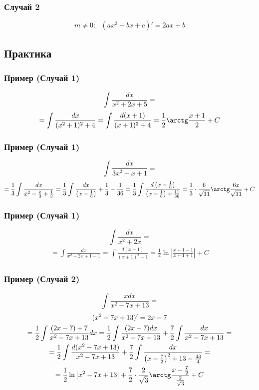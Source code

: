 \documentclass{article}
\begin{document}
\subsubsection{Случай 2}
\[
    m \neq 0: ~~~ (ax^2 + bx + c)' = 2ax + b
\]


\subsection{Практика}

\subsubsection{Пример (Случай 1)}
\[
    \int \frac{dx}{x^2 + 2x + 5} =
\]
\begin{gather*}
    = \int \frac{dx}{(x^2 + 1)^2 + 4} =
      \int \frac{d(x + 1)}{(x + 1)^2 + 4} =
      \frac{1}{2} \arctg \frac{x + 1}{2} + C
\end{gather*}

\subsubsection{Пример (Случай 1)}
\[
    \int \frac{dx}{3x^2 - x + 1} =
\]
\begin{gather*}
    = \frac{1}{3} \int \frac{dx}{x^2 - \frac{x}{3} + \frac{1}{3}} =
      \frac{1}{3} \int \frac{dx}{\left(x - \frac{1}{6}\right)} + \frac{1}{3} - \frac{1}{36} =
      \frac{1}{3} \int \frac{d\left(x - \frac{1}{6}\right)}{\left(x - \frac{1}{6}\right) + \frac{11}{36}} =
      \frac{1}{3} \cdot \frac{6}{\sqrt{11}} \arctg \frac{6x}{\sqrt{11}} + C
\end{gather*}

\subsubsection{Пример (Случай 1)}
\[
    \int \frac{dx}{x^2 + 2x} = 
\]
\begin{gather*}
    = \int \frac{dx}{x^2 + 2x + 1 - 1} =
      \int \frac{d(x + 1)}{(x + 1)^2 - 1} =
      \frac{1}{2} \ln \left|\frac{x + 1 - 1}{x + 1 + 1}\right| + C
\end{gather*}

\subsubsection{Пример (Случай 2)}
\[
    \int \frac{xdx}{x^2 - 7x + 13} =
\]
\begin{gather*}
    (x^2 - 7x + 13)' = 2x - 7 \\
    = \frac{1}{2} \int \frac{(2x - 7) + 7}{x^2 - 7x + 13} dx =
      \frac{1}{2} \int \frac{(2x - 7) dx}{x^2 - 7x + 13} + \frac{7}{2} \int \frac{dx}{x^2 - 7x + 13} = \\
    = \frac{1}{2} \int \frac{d(x^2 - 7x + 13)}{x^2 - 7x  + 13} + 
      \frac{7}{2} \int \frac{dx}{\left(x - \frac{7}{2}\right)^2 + 13 - \frac{43}{4}} = \\
    = \frac{1}{2} \ln \left|x^2 - 7x + 13\right| + 
      \frac{7}{2} \cdot \frac{2}{\sqrt{3}} \arctg \frac{x - \frac{7}{2}}{\frac{2}{\sqrt{3}}} + C
\end{gather*}
\end{document}
